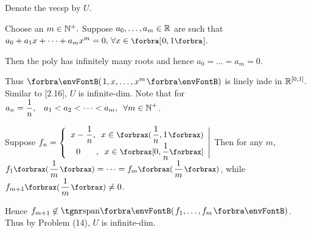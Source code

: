 \documentclass[a4paper, 11pt, UTF8]{article}
\begin{document}
\begin{large}

Denote the vecsp by $U$.\par\quad
Choose an $m\in{\mathbb{N}^+}.$ Suppose $a_0,\dots,a_m\in{\mathbb{R}}$ are such that $a_0+a_1 x+\dots+a_m x^m=0,\,\forall x\in\Sbra{0,1}.$\par\quad
Then the poly has infinitely many roots and hence $a_0=\dots=a_m=0$.\par\quad
Thus $\Par{1,x,\dots,x^m}$ is linely inde in ${\mathbb{R}}^{[0,1]}.$ Similar to [2.16], $U$ is infinite-dim.\PfEnd\vspace{10pt}\quad
\Or Note that for $a_n=\displaystyle\frac{1}{n},\,\,\,\,\,a_1<a_2<\dots<a_m,\,\,\,\forall m\in{\mathbb{N}^+}$.\par\quad
Suppose $f_n=\left\{\begin{array}{r}x-{\displaystyle\frac{1}{n}},\,\,\,x\in\XPar{\displaystyle\frac{1}{n},1}\\0\quad\;\;\;,\;\;x\in\XSbra{0,\displaystyle\frac{1}{n}}\end{array}\right|$
Then for any $m$, $f_1\XPar{\displaystyle\frac{1}{m}}=\dots=f_m\XPar{\displaystyle\frac{1}{m}}$, while $f_{m+1}\XPar{\displaystyle\frac{1}{m}}\neq 0$.\par\vspace{6pt}\quad
Hence $f_{m+1}\not\in\Span{f_1,\dots,f_m}$. Thus by Problem (14), $U$ is infinite-dim.\PfEnd
\SepLine


\end{large}
\end{document}
